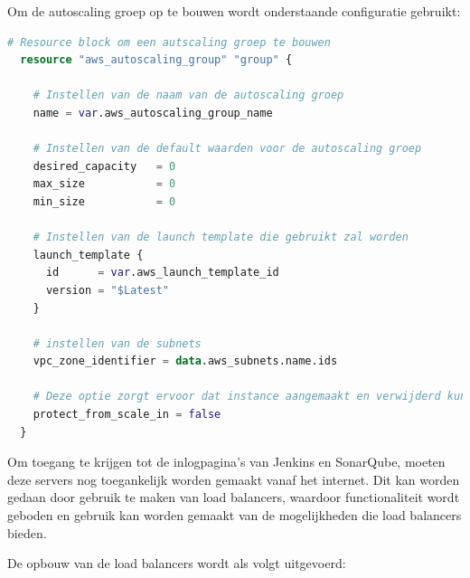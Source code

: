 Om de autoscaling groep op te bouwen wordt onderstaande configuratie gebruikt:
\newline

\begin{lstlisting}[language=terraform]
  # Resource block om een autscaling groep te bouwen
  resource "aws_autoscaling_group" "group" {
  
    # Instellen van de naam van de autoscaling groep
    name = var.aws_autoscaling_group_name
  
    # Instellen van de default waarden voor de autoscaling groep
    desired_capacity   = 0
    max_size           = 0
    min_size           = 0
  
    # Instellen van de launch template die gebruikt zal worden
    launch_template {
      id      = var.aws_launch_template_id
      version = "$Latest"
    }
  
    # instellen van de subnets
    vpc_zone_identifier = data.aws_subnets.name.ids
  
    # Deze optie zorgt ervoor dat instance aangemaakt en verwijderd kunnen worden zonder veel problemen
    protect_from_scale_in = false
  }
\end{lstlisting}

\vspace{0.5cm}
Om toegang te krijgen tot de inlogpagina's van Jenkins en SonarQube, moeten deze servers nog toegankelijk worden gemaakt vanaf het internet. Dit kan worden gedaan door gebruik te maken van load balancers, waardoor functionaliteit wordt geboden en gebruik kan worden gemaakt van de mogelijkheden die load balancers bieden. 
\newline

De opbouw van de load balancers wordt als volgt uitgevoerd:
\newline

